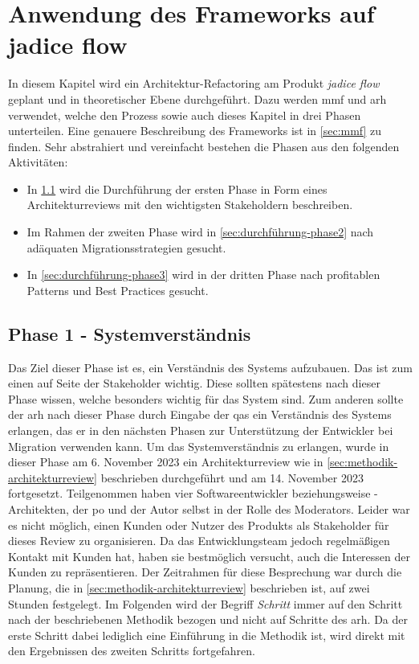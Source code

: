 \chapter{Anwendung des Frameworks auf jadice flow}
\label{chap:anwendung}

In diesem Kapitel wird ein Architektur-Refactoring am Produkt \emph{jadice flow} geplant und in theoretischer Ebene durchgeführt.
Dazu werden \acrfull{mmf} und \acrfull{arh} verwendet, welche den Prozess sowie auch dieses Kapitel in drei Phasen unterteilen.
Eine genauere Beschreibung des Frameworks ist in \cref{sec:mmf} zu finden.
Sehr abstrahiert und vereinfacht bestehen die Phasen aus den folgenden Aktivitäten:
\begin{itemize}
	\item In \cref{sec:durchführung-phase1} wird die Durchführung der ersten Phase in Form eines Architekturreviews mit den wichtigsten Stakeholdern beschreiben.
	\item Im Rahmen der zweiten Phase wird in \cref{sec:durchführung-phase2} nach adäquaten Migrationsstrategien gesucht.
	\item In \cref{sec:durchführung-phase3} wird in der dritten Phase nach profitablen Patterns und Best Practices gesucht.
\end{itemize}

\section{Phase 1 - Systemverständnis}
\label{sec:durchführung-phase1}

Das Ziel dieser Phase ist es, ein Verständnis des Systems aufzubauen.
Das ist zum einen auf Seite der Stakeholder wichtig.
Diese sollten spätestens nach dieser Phase wissen, welche  besonders wichtig für das System sind.
Zum anderen sollte der \gls{arh} nach dieser Phase durch Eingabe der \glspl{qa} ein Verständnis des Systems erlangen, das er in den nächsten Phasen zur Unterstützung der Entwickler bei Migration verwenden kann.
Um das Systemverständnis zu erlangen, wurde in dieser Phase am 6. November 2023 ein Architekturreview wie in \cref{sec:methodik-architekturreview} beschrieben durchgeführt und am 14. November 2023 fortgesetzt.
Teilgenommen haben vier Softwareentwickler beziehungsweise -Architekten, der \acrlong{po} und der Autor selbst in der Rolle des Moderators.
Leider war es nicht möglich, einen Kunden oder Nutzer des Produkts als Stakeholder für dieses Review zu organisieren.
Da das Entwicklungsteam jedoch regelmäßigen Kontakt mit Kunden hat, haben sie bestmöglich versucht, auch die Interessen der Kunden zu repräsentieren.
Der Zeitrahmen für diese Besprechung war durch die Planung, die in \cref{sec:methodik-architekturreview} beschrieben ist, auf zwei Stunden festgelegt.
Im Folgenden wird der Begriff \emph{Schritt} immer auf den Schritt nach der beschriebenen Methodik bezogen und nicht auf Schritte des \gls{arh}.
Da der erste Schritt dabei lediglich eine Einführung in die Methodik ist, wird direkt mit den Ergebnissen des zweiten Schritts fortgefahren.

